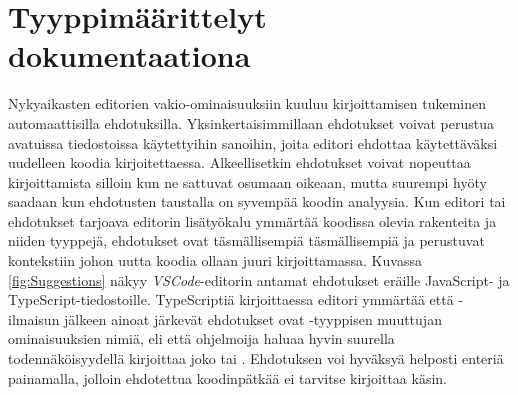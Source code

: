 \section{Tyyppimäärittelyt dokumentaationa}
Nykyaikasten editorien vakio-ominaisuuksiin kuuluu kirjoittamisen tukeminen
automaattisilla ehdotuksilla. Yksinkertaisimmillaan ehdotukset voivat
perustua avatuissa tiedostoissa käytettyihin sanoihin, joita editori ehdottaa
käytettäväksi uudelleen koodia kirjoitettaessa. Alkeellisetkin ehdotukset
voivat nopeuttaa kirjoittamista silloin kun ne sattuvat osumaan oikeaan,
mutta suurempi hyöty saadaan kun ehdotusten taustalla on syvempää koodin
analyysia. Kun editori tai ehdotukset tarjoava editorin lisätyökalu ymmärtää
koodissa olevia rakenteita ja niiden tyyppejä, ehdotukset ovat täsmällisempiä
täsmällisempiä ja perustuvat kontekstiin johon uutta koodia ollaan juuri
kirjoittamassa. Kuvassa \ref{fig:Suggestions} näkyy
\textit{VSCode}-editorin antamat ehdotukset eräille JavaScript-
ja TypeScript-tiedostoille.\newline
TypeScriptiä kirjoittaessa editori ymmärtää että -ilmaisun
jälkeen ainoat järkevät ehdotukset ovat -tyyppisen muuttujan
ominaisuuksien nimiä, eli että ohjelmoija haluaa hyvin suurella todennäköisyydellä
kirjoittaa joko  tai .
Ehdotuksen voi hyväksyä helposti enteriä painamalla, jolloin ehdotettua
koodinpätkää ei tarvitse kirjoittaa käsin.

